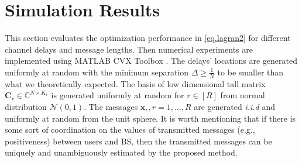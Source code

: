 \documentclass[conference,10pt]{IEEEtran}
\theoremstyle{remark}
\theoremstyle{plain}
\theoremstyle{definition}
\theoremstyle{remark}
\begin{document}





\section{Simulation Results}\label{sec.simulations}



This section evaluates the optimization performance in \eqref{eq.lagran2} for different channel delays and message lengths. Then numerical experiments are implemented using MATLAB CVX Toolbox \cite{grant2014cvx}.  The delays' locations are generated uniformly at random with the minimum separation $\Delta\geq \frac{1}{N}$ to be smaller than what we theoretically expected.  The basis of low  
dimensional tall matrix $\bm{C}_r\in \mathbb{C}^{ N \times K_r}$ is generated uniformly at random for $r\in [R]$ from normal distribution $\mathcal{N}(0,1)$. The messages $\bm{x}_r, r=1, \ldots, R$ are generated \textit{i.i.d} and uniformly at random  from the unit sphere. It is worth mentioning that if there is some sort of coordination on the values of transmitted messages (e.g., positiveness) between users and BS, then the transmitted messages can be uniquely and unambiguously estimated by the proposed method.   
\end{document}

